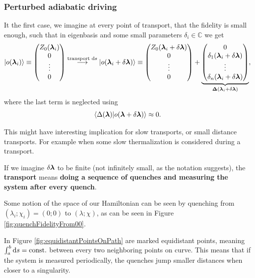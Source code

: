\subsubsection{Perturbed adiabatic driving}
It the first case, we imagine at every point of transport, that the fidelity is small enough, such that in eigenbasis and some small parameters $\delta_i\in \mathbb{C}$ we get
$$\ket{o({\bm\lambda}_i)}\equiv \begin{pmatrix}
    Z_0({\bm\lambda}_i)\\
    0\\
    \vdots \\
    0
\end{pmatrix} \overset{\text{transport }\mathrm{d} s}{\longrightarrow} \ket{o({\bm\lambda}_i+\delta {\bm\lambda})}\equiv\begin{pmatrix}
    Z_0({\bm\lambda}_i+\delta {\bm\lambda})\\
    0\\
    \vdots \\
    0
\end{pmatrix} +\underbrace{\begin{pmatrix}
    0\\
    \delta_1({\bm\lambda}_i+\delta {\bm\lambda})\\
    \vdots \\
    \delta_n({\bm\lambda}_i+\delta {\bm\lambda})
\end{pmatrix}}_{\mathbf{\Delta}({\bm\lambda}_i+\delta {\bm\lambda})}, $$
where the last term is neglected using 
$$\braket{\Delta({\bm\lambda})|o({\bm\lambda}+\delta{\bm\lambda})}\approx 0.$$

This might have interesting implication for slow transports, or small distance transports. For example when some slow thermalization is considered during a transport.




If we imagine $\delta{\bm\lambda}$ to be finite (not infinitely small, as the notation suggests), the \textbf{transport} means \textbf{doing a sequence of quenches and measuring the system after every quench}.


Some notion of the space of our Hamiltonian can be seen by quenching from $(\lambda_i;\chi_i)=(0;0)$ to $(\lambda;\chi)$, as can be seen in Figure \ref{fig:quenchFidelityFrom00}.

In Figure \ref{fig:equidistantPointsOnPath} are marked equidistant points, meaning $\int_a^b \mathrm{d} s=\text{const.}$ between every two neighboring points on curve. This means that if the system is measured periodically, the quenches jump smaller distances when closer to a singularity.

